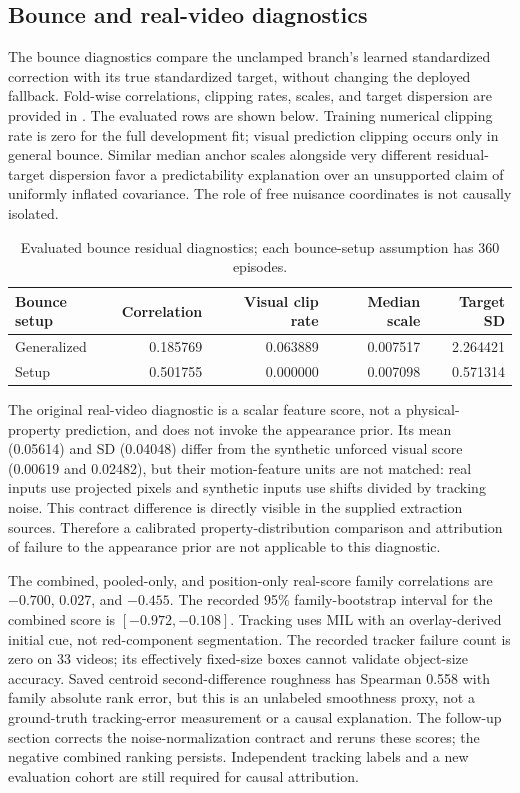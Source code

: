 \subsection{Bounce and real-video diagnostics}
The bounce diagnostics compare the unclamped branch's learned standardized correction with its true standardized target, without changing the deployed fallback. Fold-wise correlations, clipping rates, scales, and target dispersion are provided in . The evaluated rows are shown below. Training numerical clipping rate is zero for the full development fit; visual prediction clipping occurs only in general bounce. Similar median anchor scales alongside very different residual-target dispersion favor a predictability explanation over an unsupported claim of uniformly inflated covariance. The role of free nuisance coordinates is not causally isolated.
\begin{table}[htbp]\centering\small
\caption{Evaluated bounce residual diagnostics; each bounce-setup assumption has 360 episodes.}\label{tab:ext_bounce}
\begin{tabular}{lrrrr}\toprule
Bounce setup & Correlation & Visual clip rate & Median scale & Target SD\\\midrule
Generalized & 0.185769 & 0.063889 & 0.007517 & 2.264421\\
Setup & 0.501755 & 0.000000 & 0.007098 & 0.571314\\
\bottomrule\end{tabular}
\end{table}
The original real-video diagnostic is a scalar feature score, not a physical-property prediction, and does not invoke the appearance prior. Its mean (0.05614) and SD (0.04048) differ from the synthetic unforced visual score (0.00619 and 0.02482), but their motion-feature units are not matched: real inputs use projected pixels and synthetic inputs use shifts divided by tracking noise. This contract difference is directly visible in the supplied extraction sources. Therefore a calibrated property-distribution comparison and attribution of failure to the appearance prior are not applicable to this diagnostic.

The combined, pooled-only, and position-only real-score family correlations are $-0.700$, 0.027, and $-0.455$. The recorded 95\% family-bootstrap interval for the combined score is $[-0.972,-0.108]$. Tracking uses MIL with an overlay-derived initial cue, not red-component segmentation. The recorded tracker failure count is zero on 33 videos; its effectively fixed-size boxes cannot validate object-size accuracy. Saved centroid second-difference roughness has Spearman 0.558 with family absolute rank error, but this is an unlabeled smoothness proxy, not a ground-truth tracking-error measurement or a causal explanation. The follow-up section corrects the noise-normalization contract and reruns these scores; the negative combined ranking persists. Independent tracking labels and a new evaluation cohort are still required for causal attribution.

